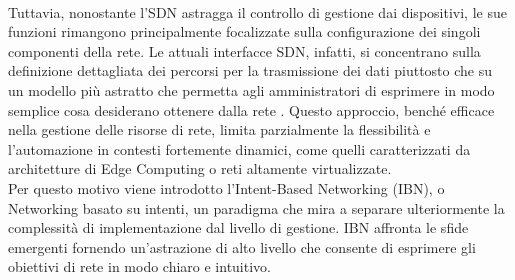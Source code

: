 \\Tuttavia, nonostante l'SDN astragga il controllo di gestione dai dispositivi, le sue funzioni rimangono principalmente focalizzate sulla configurazione dei singoli componenti della rete. Le attuali interfacce SDN, infatti, si concentrano sulla definizione dettagliata dei percorsi per la trasmissione dei dati 
piuttosto che su un modello più astratto che permetta agli amministratori di esprimere in modo semplice cosa desiderano ottenere dalla rete \cite{sdnart}. 
Questo approccio, benché efficace nella gestione delle risorse di rete, limita parzialmente la flessibilità e l'automazione in contesti fortemente dinamici, come quelli caratterizzati da architetture di Edge Computing o reti altamente virtualizzate.
\\Per questo motivo viene introdotto l'Intent-Based Networking (IBN), o Networking basato su intenti, un paradigma che mira a separare ulteriormente la complessità di implementazione dal livello di gestione. 
IBN affronta le sfide emergenti fornendo un'astrazione di alto livello che consente di esprimere gli obiettivi di rete in modo chiaro e intuitivo.  
